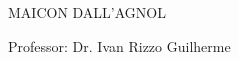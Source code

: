  \begin{capa}
	\begin{center}
	\Large\imprimirinstituicao
	\end{center}

	\begin{center}
	\vspace*{3.4cm}
	\Large MAICON DALL'AGNOL
	\vspace*{1.5cm}
	
	\Large \textbf{\imprimirtitulo}
	
	\vspace*{3.4cm}
	
	\noindent Professor: Dr. Ivan Rizzo Guilherme
	
	\vspace*{3.4cm}
	
	{\large\imprimirlocal}
	\par
	{\large\imprimirdata}
	\vspace*{1cm}
	\end{center}
  \end{capa}